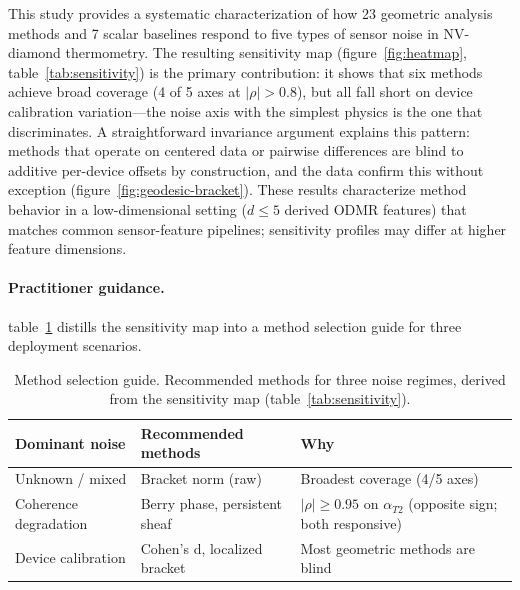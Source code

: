 \documentclass[11pt]{article}
\begin{document}
This study provides a systematic characterization of how 23 geometric
analysis methods and 7 scalar baselines respond to five types of sensor
noise in NV-diamond thermometry.  The resulting sensitivity map
(figure~\ref{fig:heatmap}, table~\ref{tab:sensitivity}) is the primary
contribution: it shows that six methods achieve broad coverage (4 of 5
axes at $|\rho| > 0.8$), but all fall short on device calibration
variation---the noise axis with the simplest physics is the one that
discriminates.  A straightforward invariance argument explains this
pattern: methods that operate on centered data or pairwise differences
are blind to additive per-device offsets by construction, and the data
confirm this without exception (figure~\ref{fig:geodesic-bracket}).
These results characterize method behavior in a low-dimensional setting
($d \leq 5$ derived ODMR features) that matches common sensor-feature
pipelines; sensitivity profiles may differ at higher feature dimensions.

\paragraph{Practitioner guidance.}
table~\ref{tab:guide} distills the sensitivity map into a method
selection guide for three deployment scenarios.

\begin{table}[h]
\centering
\caption{Method selection guide.  Recommended methods for three
  noise regimes, derived from the sensitivity map
  (table~\ref{tab:sensitivity}).}
\label{tab:guide}
\small
\begin{tabular}{@{}lll@{}}
\toprule
Dominant noise & Recommended methods & Why \\
\midrule
Unknown / mixed & Bracket norm (raw) & Broadest coverage (4/5 axes) \\
Coherence degradation & Berry phase, persistent sheaf & $|\rho| \geq 0.95$ on $\alpha_{T2}$ (opposite sign; both responsive) \\
Device calibration & Cohen's d, localized bracket & Most geometric methods are blind \\
\bottomrule
\end{tabular}
\end{table}
\end{document}
